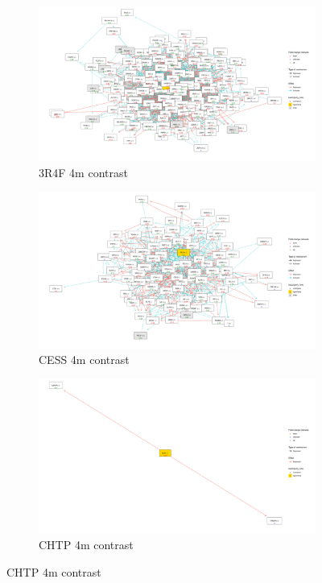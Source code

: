 \begin{figure}
    \begin{subfigure}{0.3\linewidth}
        \includegraphics[width=\textwidth, height=\textheight, keepaspectratio]{Major Thesis/figures/iut/graph/3R4F4m50-SP1.png}
            \caption{3R4F 4m contrast}
            \label{img:smoke}
    \end{subfigure}
    \hfill
    \begin{subfigure}{0.3\linewidth}
        \includegraphics[width=\textwidth, height=\textheight, keepaspectratio]{Major Thesis/figures/iut/graph/CESS4m50-RELA.png}
            \caption{CESS 4m contrast}
            \label{img:prev-smoke}
    \end{subfigure}
    \hfill
    \begin{subfigure}{0.3\linewidth}
        \centering
        \includegraphics[width=\textwidth, height=\textheight, keepaspectratio]{Major Thesis/figures/iut/graph/CHTP4m-E2F1.png}
            \caption{CHTP 4m contrast}
            \label{img:non-smoke}
    \end{subfigure}
    

\end{figure}
